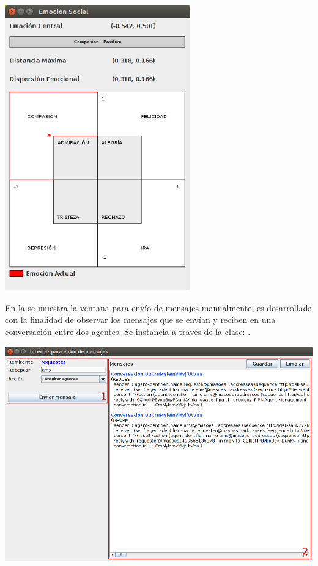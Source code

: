 \begin{ilustracion}[fuente=\yo, etiqueta=interfaz-emocion-social, titulo={Interfaz Para Observar la Emoción Social del Grupo de Agentes}]
\includegraphics[width=8cm]{ilustraciones/interfaces/emocion-social.png}
\end{ilustracion}


En la 
se muestra la ventana para envío de mensajes manualmente, es desarrollada con la finalidad de observar
los mensajes que se envían y reciben en una conversación entre dos agentes.
Se instancia a través de la clase: .

\begin{ilustracion}[fuente=\yo, etiqueta=envio-de-mensajes, titulo={Interfaz Para Envío de Mensajes Manualmente}]
\includegraphics[width=14cm]{ilustraciones/interfaces/interfaz-para-envio-de-mensajes-recuadros.png}
\end{ilustracion}


